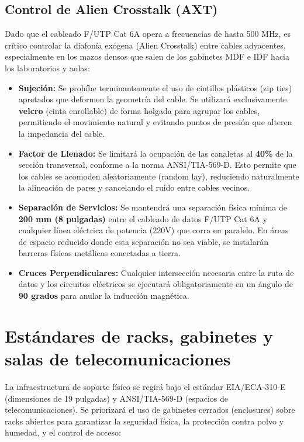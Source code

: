 \subsection*{Control de Alien Crosstalk (AXT)}

Dado que el cableado F/UTP Cat 6A opera a frecuencias de hasta 500 MHz, es crítico controlar la diafonía exógena (Alien Crosstalk) entre cables adyacentes, especialmente en los mazos densos que salen de los gabinetes MDF e IDF hacia los laboratorios y aulas:

\begin{itemize}
    \item \textbf{Sujeción:} Se prohíbe terminantemente el uso de cintillos plásticos (zip ties) apretados que deformen la geometría del cable. Se utilizará exclusivamente \textbf{velcro} (cinta enrollable) de forma holgada para agrupar los cables, permitiendo el movimiento natural y evitando puntos de presión que alteren la impedancia del cable.
    \item \textbf{Factor de Llenado:} Se limitará la ocupación de las canaletas al \textbf{40\%} de la sección transversal, conforme a la norma ANSI/TIA-569-D. Esto permite que los cables se acomoden aleatoriamente (random lay), reduciendo naturalmente la alineación de pares y cancelando el ruido entre cables vecinos.
    \item \textbf{Separación de Servicios:} Se mantendrá una separación física mínima de \textbf{200 mm (8 pulgadas)} entre el cableado de datos F/UTP Cat 6A y cualquier línea eléctrica de potencia (220V) que corra en paralelo. En áreas de espacio reducido donde esta separación no sea viable, se instalarán barreras físicas metálicas conectadas a tierra.
    \item \textbf{Cruces Perpendiculares:} Cualquier intersección necesaria entre la ruta de datos y los circuitos eléctricos se ejecutará obligatoriamente en un ángulo de \textbf{90 grados} para anular la inducción magnética.
\end{itemize}

\section{Estándares de racks, gabinetes y salas de telecomunicaciones}

La infraestructura de soporte físico se regirá bajo el estándar EIA/ECA-310-E (dimensiones de 19 pulgadas) y ANSI/TIA-569-D (espacios de telecomunicaciones). Se priorizará el uso de gabinetes cerrados (enclosures) sobre racks abiertos para garantizar la seguridad física, la protección contra polvo y humedad, y el control de acceso:


